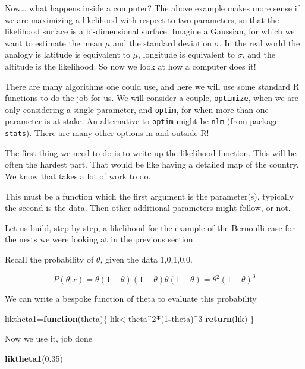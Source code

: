 \documentclass[
]{book}
\newenvironment{Shaded}{\begin{snugshade}}{\end{snugshade}}
\newcommand{\ControlFlowTok}[1]{\textcolor[rgb]{0.13,0.29,0.53}{\textbf{#1}}}
\newcommand{\DecValTok}[1]{\textcolor[rgb]{0.00,0.00,0.81}{#1}}
\newcommand{\FloatTok}[1]{\textcolor[rgb]{0.00,0.00,0.81}{#1}}
\newcommand{\KeywordTok}[1]{\textcolor[rgb]{0.13,0.29,0.53}{\textbf{#1}}}
\newcommand{\NormalTok}[1]{#1}
\newcommand{\OperatorTok}[1]{\textcolor[rgb]{0.81,0.36,0.00}{\textbf{#1}}}
\begin{document}
Now\ldots{} what happens inside a computer? The above example makes more sense if we are maximizing a likelihood with respect to two parameters, so that the likelihood surface is a bi-dimensional surface. Imagine a Gaussian, for which we want to estimate the mean \(\mu\) and the standard deviation \(\sigma\). In the real world the analogy is latitude is equivalent to \(\mu\), longitude is equivalent to \(\sigma\), and the altitude is the likelihood. So now we look at how a computer does it!

There are many algorithms one could use, and here we will use some standard R functions to do the job for us. We will consider a couple, \texttt{optimize}, when we are only considering a single parameter, and \texttt{optim}, for when more than one parameter is at stake. An alternative to \texttt{optim} might be \texttt{nlm} (from package \texttt{stats}). There are many other options in and outside R!

The first thing we need to do is to write up the likelihood function. This will be often the hardest part. That would be like having a detailed map of the country. We know that takes a lot of work to do.

This must be a function which the first argument is the parameter(s), typically the second is the data. Then other additional parameters might follow, or not.

Let us build, step by step, a likelihood for the example of the Bernoulli case for the nests we were looking at in the previous section.

Recall the probability of \(\theta\), given the data 1,0,1,0,0.

\[P(\theta|x)=\theta (1-\theta) (1-\theta) \theta (1-\theta)=\theta^2 (1-\theta)^3\]

We can write a bespoke function of theta to evaluate this probability

\begin{Shaded}
\begin{Highlighting}[]
\NormalTok{liktheta1=}\ControlFlowTok{function}\NormalTok{(theta)\{}
\NormalTok{  lik<-theta}\OperatorTok{^}\DecValTok{2}\OperatorTok{*}\NormalTok{(}\DecValTok{1}\OperatorTok{-}\NormalTok{theta)}\OperatorTok{^}\DecValTok{3}
  \KeywordTok{return}\NormalTok{(lik)}
\NormalTok{\}}
\end{Highlighting}
\end{Shaded}

Now we use it, job done

\begin{Shaded}
\begin{Highlighting}[]
\KeywordTok{liktheta1}\NormalTok{(}\FloatTok{0.35}\NormalTok{)}
\end{Highlighting}
\end{Shaded}
\end{document}
